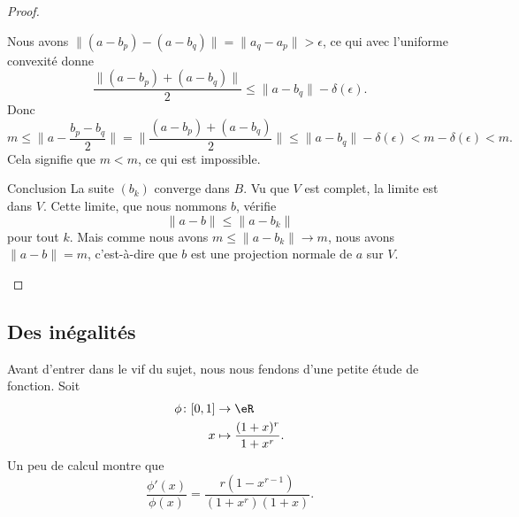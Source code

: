\begin{proof}
\begin{subproof}
\begin{subproof}
                    
                    Nous avons \( \| (a-b_p)-(a-b_q) \|=\| a_q-a_p \|>\epsilon\), ce qui avec l'uniforme convexité donne
                    \begin{equation}
                        \frac{ \| (a-b_p)+(a-b_q) \| }{2}\leq \| a-b_q \|-\delta(\epsilon).
                    \end{equation}
                    Donc
                    \begin{equation}
                        m\leq \| a-\frac{ b_p-b_q }{ 2 } \|=\| \frac{ (a-b_p)+(a-b_q) }{2} \|\leq \| a-b_q \|-\delta(\epsilon)<m-\delta(\epsilon)<m.
                    \end{equation}
                    Cela signifie que \( m<m\), ce qui est impossible.
                \item[Conclusion]
                    La suite \( (b_k)\) converge dans \( B\). Vu que \( V\) est complet, la limite est dans \( V\). Cette limite, que nous nommons \( b\), vérifie
                    \begin{equation}
                        \| a-b \|\leq \| a-b_k \|
                    \end{equation}
                    pour tout \( k\). Mais comme nous avons \( m\leq \| a-b_k \|\to m\), nous avons \( \| a-b \|=m\), c'est-à-dire que \( b\) est une projection normale de \( a\) sur \( V\).
            \end{subproof}
    \end{subproof}
\end{proof}

\subsection{Des inégalités}

Avant d'entrer dans le vif du sujet, nous nous fendons d'une petite étude de fonction. Soit
\begin{equation}
    \begin{aligned}
        \phi\colon \mathopen[ 0 , 1 \mathclose]&\to \eR \\
        x&\mapsto \frac{ (1+x)^r }{ 1+x^r }. 
    \end{aligned}
\end{equation}
Un peu de calcul montre que
\begin{equation}
    \frac{ \phi'(x) }{ \phi(x) }=\frac{ r(1-x^{r-1}) }{ (1+x^r)(1+x) }.
\end{equation}


